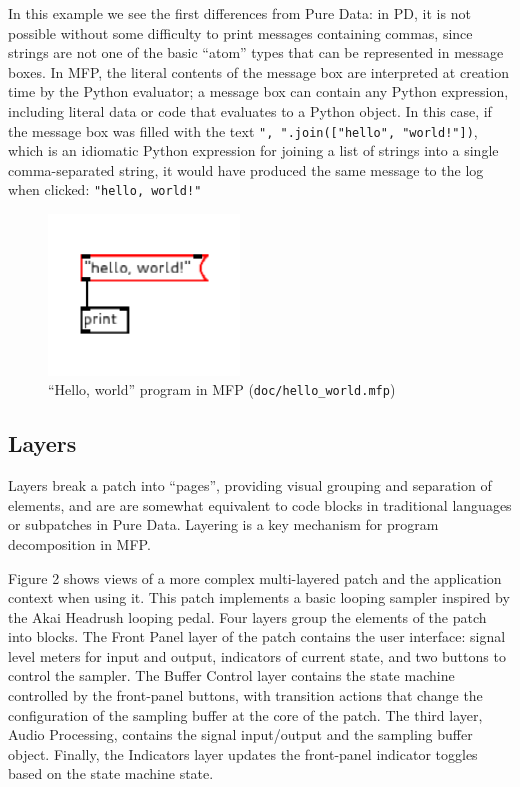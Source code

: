 \documentclass[11pt,a4paper]{article}
\begin{document}
In this example we see the first differences from Pure Data: in PD, it is
not possible without some difficulty to print messages containing commas,
since strings are not one of the basic ``atom'' types that can be represented
in message boxes.  In MFP, the literal contents of the message box are
interpreted at creation time by the Python evaluator; a message box can
contain any Python expression, including literal data or code that
evaluates to a Python object.  In this case, if the message box was filled
with the text \texttt{", ".join(["hello", "world!"])}, which is an idiomatic
Python expression for joining a list of strings into a single
comma-separated string, it would have produced the same message to the log
when clicked: \texttt{"hello, world!"}

\begin{figure}
    \centering\includegraphics[width=2in]{hello_world.png}
    \caption{``Hello, world'' program in MFP (\texttt{doc/hello\_world.mfp})}
\end{figure}

\subsection{Layers}

Layers break a patch into ``pages'', providing visual grouping and
separation of elements, and are are somewhat equivalent to code blocks in
traditional languages or subpatches in Pure Data.  Layering is a key
mechanism for program decomposition in MFP.  

Figure 2 shows views of a more complex multi-layered patch and the
application context when using it.  This patch implements a basic looping
sampler inspired by the Akai Headrush looping pedal.  Four layers group
the elements of the patch into blocks.  The Front Panel layer of the patch
contains the user interface: signal level meters for input and output,
indicators of current state, and two buttons to control the sampler.  The
Buffer Control layer contains the state machine controlled by the
front-panel buttons, with transition actions that change the configuration
of the sampling buffer at the core of the patch.  The third layer, Audio
Processing, contains the signal input/output and the sampling buffer
object.  Finally, the Indicators layer updates the front-panel indicator 
toggles based on the state machine state. 
\end{document}
